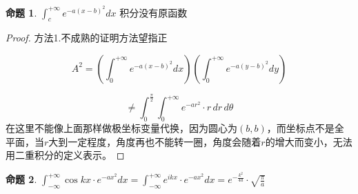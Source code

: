\documentclass[12pt,a4paper]{article}
\numberwithin{subsection}{section}   %
\numberwithin{subsubsection}{subsection}
\theoremstyle{plain}
\theoremstyle{definition}
\newtheorem{example}{命题}[subsection]  %
\theoremstyle{remark}
\theoremstyle{remark}
\begin{document}
	\begin{example}
		\label{ex:2}
		$	\int_{c}^{+\infty} e^{-a(x-b)^2} dx$
		积分没有原函数
	\end{example}
	
	\begin{proof}
		
		
		方法1.不成熟的证明方法望指正
		
		
		
		
		
		\begin{equation*}
			A^2 = \left( \int_{0}^{+\infty} e^{-a(x-b)^2} dx \right) \left( \int_{0}^{+\infty} e^{-a(y-b)^2} dy \right)
		\end{equation*}
		
		\begin{equation*}
			\neq \int_{0}^{\frac{\pi}{2}} \int_{0}^{+\infty} e^{-ar^2} \cdot r \, dr \, d\theta
		\end{equation*}
		在这里不能像上面那样做极坐标变量代换，因为圆心为$(b,b)$，而坐标点不是全平面，当$r$大到一定程度，角度再也不能转一圈，角度会随着$r$的增大而变小，无法用二重积分的定义表示。
		
		
	\end{proof}
	
	
	\begin{example}\label{ex:3}
		$\int_{-\infty}^{+\infty} \cos kx \cdot e^{-a x^2} dx=\int_{-\infty}^{+\infty} e^{ikx} \cdot e^{-a x^2} dx= e^{-\frac{k^2}{4a}} \cdot \sqrt{\frac{\pi}{a}}$
	\end{example}
	
\end{document}
